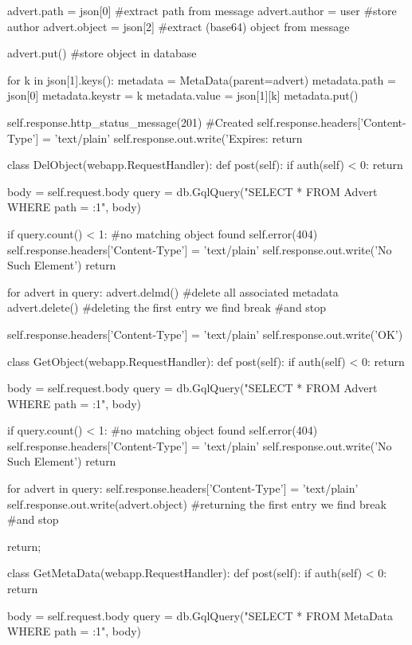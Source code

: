 \begin{code}
    advert.path   = json[0] #extract path from message
    advert.author = user    #store author
    advert.object = json[2] #extract (base64) object from message
    
    advert.put() #store object in database
    
    for k in json[1].keys():
      metadata        = MetaData(parent=advert)
      metadata.path   = json[0]
      metadata.keystr = k
      metadata.value  = json[1][k]
      metadata.put()
    
    self.response.http_status_message(201) #Created
    self.response.headers['Content-Type'] = 'text/plain'
    self.response.out.write('Expires: %
    return

class DelObject(webapp.RequestHandler):
  def post(self):
    if auth(self) < 0: return
    
    body  = self.request.body
    query = db.GqlQuery("SELECT * FROM Advert WHERE path = :1", body)
    
    if query.count() < 1: #no matching object found
      self.error(404)
      self.response.headers['Content-Type'] = 'text/plain'
      self.response.out.write('No Such Element')
      return      
    
    for advert in query:
      advert.delmd()  #delete all associated metadata
      advert.delete() #deleting the first entry we find
      break #and stop
  
    self.response.headers['Content-Type'] = 'text/plain'
    self.response.out.write('OK')
    
class GetObject(webapp.RequestHandler):
  def post(self):
    if auth(self) < 0: return
    
    body  = self.request.body
    query = db.GqlQuery("SELECT * FROM Advert WHERE path = :1", body)
    
    if query.count() < 1: #no matching object found
      self.error(404)
      self.response.headers['Content-Type'] = 'text/plain'
      self.response.out.write('No Such Element')
      return      
    
    for advert in query:
      self.response.headers['Content-Type'] = 'text/plain'
      self.response.out.write(advert.object) #returning the first entry we find
      break #and stop
    
    return;
  
class GetMetaData(webapp.RequestHandler):
  def post(self):
    if auth(self) < 0: return
    
    body  = self.request.body
    query = db.GqlQuery("SELECT * FROM MetaData WHERE path = :1", body)
    

\end{code}
